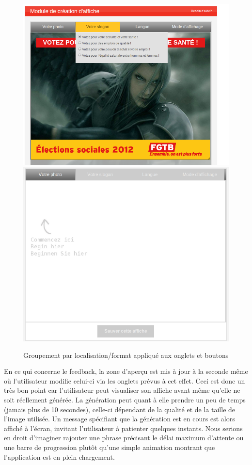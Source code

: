 \documentclass{article}
\begin{document}
\begin{sffamily}
\begin{figure}[h!]
	\begin{center}
		\includegraphics[scale=0.3]{ergo_006.png} 
		\includegraphics[scale=0.29]{ergo_007.png} 
		\caption{Groupement par localisation/format appliqué aux onglets et boutons}
	\end{center}
\end{figure}

En ce qui concerne le feedback, la zone d'aperçu est mis à jour à la seconde même où l'utilisateur modifie celui-ci via les onglets prévus à cet effet. Ceci est donc un très 
bon point car l'utilisateur peut visualiser son affiche avant même qu'elle ne soit réellement générée. La génération peut quant à elle prendre un peu de temps (jamais plus 
de 10 secondes), celle-ci dépendant de la qualité et de la taille de l'image utilisée. Un message spécifiant que la génération est en cours est alors affiché à l'écran, 
invitant l'utilisateur à patienter quelques instants. Nous serions en droit d'imaginer rajouter une phrase précisant le délai maximum d'attente ou une barre de progression 
plutôt qu'une simple animation montrant que l'application est en plein chargement. \\


\end{sffamily}
\end{document}

